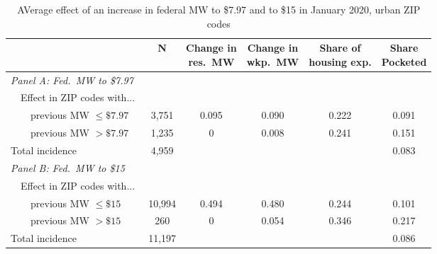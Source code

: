 \begin{table}[hbt!]
    \centering
    \caption{AVerage effect of an increase in federal MW to \$7.97 and to \$15 
             in January 2020, urban ZIP codes}
    \label{tab:counterfactuals_other}

    \begin{tabular}{@{}lccccc@{}}
        \toprule
                         & N & \shortstack{Change in\\res.\ MW}
                             & \shortstack{Change in\\wkp.\ MW}
                             & \shortstack{Share of\\housing exp.}  
                             & \shortstack{Share\\Pocketed}                      \\ \midrule
        \textit{Panel A: Fed.\ MW to \$7.97}         &      &       &       &     &      \\
        $\quad $Effect in ZIP codes with...          &      &       &       &     &      \\
        $\quad \quad$previous MW $\leq\$7.97\quad$   & 3,751 &  0.095 & 0.090  & 0.222 &  0.091   \\
        $\quad \quad$previous MW $>\$7.97\quad$      & 1,235 &  0 & 0.008  & 0.241 & 0.151    \\
        Total incidence                              & 4,959 &      &      &     & 0.083    \\[.3em]
        \textit{Panel B: Fed.\ MW to \$15}           &      &       &       &     &      \\
        $\quad $Effect in ZIP codes with...          &      &       &       &     &      \\
        $\quad \quad$previous MW $\leq\$15\quad$     & 10,994 &  0.494 & 0.480  & 0.244 &  0.101   \\
        $\quad \quad$previous MW $>\$15\quad$        & 260 &  0 & 0.054  & 0.346 & 0.217    \\
        Total incidence                              & 11,197 &      &      &     & 0.086    \\ \bottomrule
    \end{tabular}
    

\end{table}

